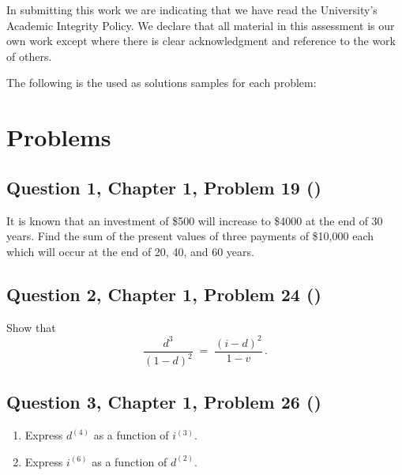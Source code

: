 \documentclass[12pt, a4paper]{article}
\begin{document}
\begin{titlepage}
    
    \vspace{0.5cm}
    
    {\footnotesize In submitting this work we are indicating
    that we have read the University's Academic Integrity Policy. We
    declare that all material in this assessment is our own work except
    where there is clear acknowledgment and reference to the work of
    others.\par}
\end{titlepage}
The following is the used as solutions samples for each problem:
\newpage
\section*{Problems}
\subsection*{Question 1, Chapter 1, Problem 19  (\cite{boyce11th})}


\noindent It is known that an investment of \$500 will increase to \$4000 at the end of 30 years. Find the sum of the present values of three payments of \$10{,}000 each which will occur at the end of 20, 40, and 60 years.


\subsection*{Question 2, Chapter 1, Problem 24 (\cite{boyce11th})}


\noindent Show that
\[
\frac{d^{3}}{(1-d)^{2}} \;=\; \frac{(i-d)^{2}}{1-v}\, .
\]

\subsection*{Question 3, Chapter 1, Problem 26 (\cite{boyce11th})}



\noindent 
    \begin{enumerate}[label=\textbf{(\alph*)}, itemsep=2pt, topsep=2pt]
      \item Express \(d^{(4)}\) as a function of \(i^{(3)}\).
      \item Express \(i^{(6)}\) as a function of \(d^{(2)}\).
    \end{enumerate}
\end{document}
